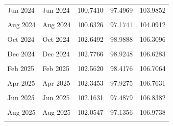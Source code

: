 \begin{tabular}[t]{llrrr}
Jun 2024 & Jun 2024 & 100.7410 & 97.4969 & 103.9852\\
\cellcolor{gray!10}{Jul 2024} & \cellcolor{gray!10}{Jul 2024} & \cellcolor{gray!10}{100.7182} & \cellcolor{gray!10}{97.3652} & \cellcolor{gray!10}{104.0713}\\
Aug 2024 & Aug 2024 & 100.6326 & 97.1741 & 104.0912\\
\cellcolor{gray!10}{Sep 2024} & \cellcolor{gray!10}{Sep 2024} & \cellcolor{gray!10}{101.2454} & \cellcolor{gray!10}{97.6845} & \cellcolor{gray!10}{104.8064}\\
Oct 2024 & Oct 2024 & 102.6492 & 98.9888 & 106.3096\\
\cellcolor{gray!10}{Nov 2024} & \cellcolor{gray!10}{Nov 2024} & \cellcolor{gray!10}{102.8354} & \cellcolor{gray!10}{99.0781} & \cellcolor{gray!10}{106.5927}\\
Dec 2024 & Dec 2024 & 102.7766 & 98.9248 & 106.6283\\
\cellcolor{gray!10}{Jan 2025} & \cellcolor{gray!10}{Jan 2025} & \cellcolor{gray!10}{102.4697} & \cellcolor{gray!10}{98.4690} & \cellcolor{gray!10}{106.4705}\\
Feb 2025 & Feb 2025 & 102.5620 & 98.4176 & 106.7064\\
\cellcolor{gray!10}{Mar 2025} & \cellcolor{gray!10}{Mar 2025} & \cellcolor{gray!10}{102.4538} & \cellcolor{gray!10}{98.1705} & \cellcolor{gray!10}{106.7371}\\
Apr 2025 & Apr 2025 & 102.3453 & 97.9275 & 106.7631\\
\cellcolor{gray!10}{May 2025} & \cellcolor{gray!10}{May 2025} & \cellcolor{gray!10}{102.2129} & \cellcolor{gray!10}{97.6646} & \cellcolor{gray!10}{106.7612}\\
Jun 2025 & Jun 2025 & 102.1631 & 97.4879 & 106.8382\\
\cellcolor{gray!10}{Jul 2025} & \cellcolor{gray!10}{Jul 2025} & \cellcolor{gray!10}{102.1403} & \cellcolor{gray!10}{97.3416} & \cellcolor{gray!10}{106.9390}\\
Aug 2025 & Aug 2025 & 102.0547 & 97.1356 & 106.9738\\
\cellcolor{gray!10}{Sep 2025} & \cellcolor{gray!10}{Sep 2025} & \cellcolor{gray!10}{102.6553} & \cellcolor{gray!10}{97.6187} & \cellcolor{gray!10}{107.6920}\\
\bottomrule
\end{tabular}

